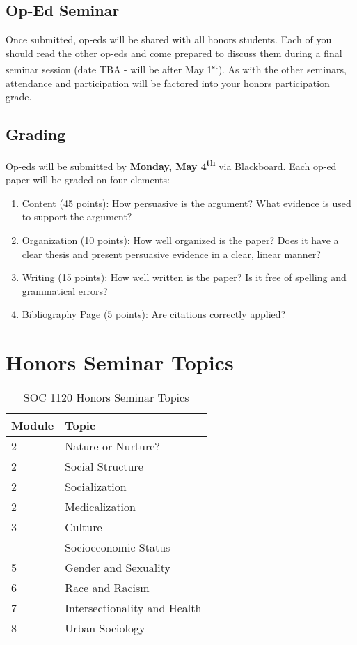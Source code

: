 \documentclass[
]{book}
\providecommand{\tightlist}{%
  \setlength{\itemsep}{0pt}\setlength{\parskip}{0pt}}
\begin{document}
\hypertarget{op-ed-seminar}{%
\subsection{Op-Ed Seminar}\label{op-ed-seminar}}

Once submitted, op-eds will be shared with all honors students. Each of you should read the other op-eds and come prepared to discuss them during a final seminar session (date TBA - will be after May 1\textsuperscript{st}). As with the other seminars, attendance and participation will be factored into your honors participation grade.

\hypertarget{grading-1}{%
\subsection{Grading}\label{grading-1}}

Op-eds will be submitted by \textbf{Monday, May 4\textsuperscript{th}} via Blackboard. Each op-ed paper will be graded on four elements:

\begin{enumerate}
\def\labelenumi{\arabic{enumi}.}
\tightlist
\item
  Content (45 points): How persuasive is the argument? What evidence is used to support the argument?
\item
  Organization (10 points): How well organized is the paper? Does it
  have a clear thesis and present persuasive evidence in a clear, linear manner?
\item
  Writing (15 points): How well written is the paper? Is it free of
  spelling and grammatical errors?
\item
  Bibliography Page (5 points): Are citations correctly applied?
\end{enumerate}

\hypertarget{honors-seminar-topics}{%
\section{Honors Seminar Topics}\label{honors-seminar-topics}}

\begin{table}

\caption{\label{tab:unnamed-chunk-4}SOC 1120 Honors Seminar Topics}
\centering
\begin{tabular}[t]{ll}
\toprule
Module & Topic\\
\midrule
2 & Nature or Nurture?\\
2 & Social Structure\\
2 & Socialization\\
2 & Medicalization\\
3 & Culture\\
\addlinespace
4 & Socioeconomic Status\\
5 & Gender and Sexuality\\
6 & Race and Racism\\
7 & Intersectionality and Health\\
8 & Urban Sociology\\
\bottomrule
\end{tabular}
\end{table}
\end{document}
